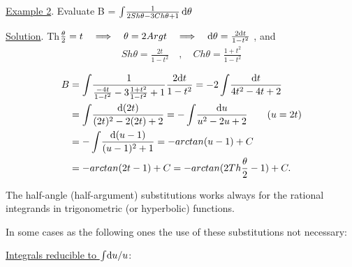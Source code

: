 \documentclass{amsbook}
\begin{document}
\par \underline{Example 2}. Evaluate B = $\int \! \frac{1}{2Sh\theta - 3Ch\theta +1} \, \mathrm{d} \theta $\\
\par \underline{Solution}. Th$\frac{\theta}{2}=t\quad\Longrightarrow
\quad\theta =2Argt\quad\Longrightarrow
\quad\mathrm{d} \theta =\frac{2\mathrm{d} t}{1-t^{2}}$ , and\\
\begin{align*}
Sh\theta=\frac{2t}{1-t^{2}}\quad , \quad Ch\theta=\frac{1+t^{2}}{1-t^{2}}\\
\end{align*}
\begin{align*}
B
&=\int \! \frac{1}{\frac{-4t}{1-t^{2}}-3\frac{1+t^{2}}{1-t^{2}}+1}\frac{2\mathrm{d} t}{1-t^{2}}=-2 \int \! \frac{\mathrm{d} t}{4t^{2}-4t+2}\\
&=\int \! \frac{\mathrm{d} (2t)}{(2t)^{2}-2(2t)+2}=-\int \! \frac{\mathrm{d} u}{u^{2}-2u+2} \qquad (u=2t)\\
&=-\int \! \frac{\mathrm{d} (u-1)}{(u-1)^{2}+1}=-arctan(u-1)+C\\
&=-arctan(2t-1)+C=-arctan(2Th\frac{\theta}{2}-1)+C.\\
\end{align*}
\par The half-angle (half-argument) substitutions works always for the rational integrands in trigonometric (or hyperbolic) functions.\\
\par In some cases as the following ones the use of these substitutions not necessary:\\
\par \underline{Integrals reducible to $\int \! \mathrm{d}  u /u$}:\\
\end{document}
